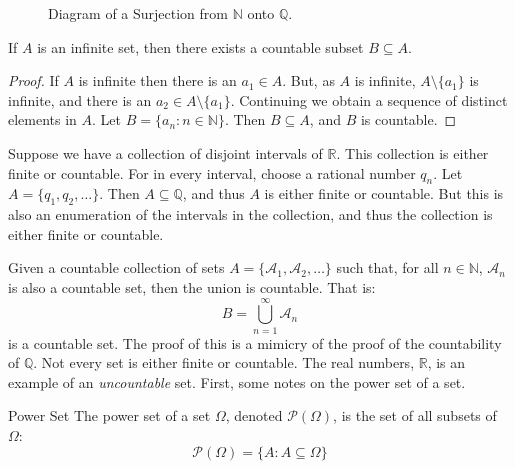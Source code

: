         \begin{figure}[H]
            \centering
            \captionsetup{type=figure}
            \resizebox{\textwidth}{!}{%
                
            }
            \caption{Diagram of a Surjection from
                     $\mathbb{N}$ onto $\mathbb{Q}$.}
            \label{fig:Bijection_N_and_Q}
        \end{figure}
        \begin{theorem}
            If $A$ is an infinite set, then there exists a
            countable subset $B\subseteq{A}$.
        \end{theorem}
        \begin{proof}
            If $A$ is infinite then there is an
            $a_{1}\in{A}$. But, as $A$ is infinite,
            $A\setminus\{a_{1}\}$ is infinite, and there
            is an $a_{2}\in{A}\setminus\{a_{1}\}$. Continuing
            we obtain a sequence of distinct elements in $A$.
            Let $B=\{a_{n}:n\in\mathbb{N}\}$. Then
            $B\subseteq{A}$, and $B$ is countable.
        \end{proof}
        \begin{lexample}
            Suppose we have a collection of disjoint intervals
            of $\mathbb{R}$. This collection is either finite
            or countable. For in every interval, choose a
            rational number $q_{n}$. Let
            $A=\{q_{1},q_{2},\hdots\}$. Then
            $A\subseteq\mathbb{Q}$, and thus $A$ is either
            finite or countable. But this is also an enumeration
            of the intervals in the collection, and thus the
            collection is either finite or countable.
        \end{lexample}
        Given a countable collection of sets
        $A=\{\mathcal{A}_{1},\mathcal{A}_{2},\hdots\}$ such
        that, for all $n\in\mathbb{N}$, $\mathcal{A}_{n}$ is
        also a countable set, then the union is countable. That is:
        \begin{equation}
            B=\bigcup_{n=1}^{\infty}\mathcal{A}_{n}
        \end{equation}
        is a countable set. The proof of this is a mimicry of
        the proof of the countability of $\mathbb{Q}$. Not
        every set is either finite or countable. The real numbers,
        $\mathbb{R}$, is an example of an \textit{uncountable}
        set. First, some notes on the power set of a set.
        \begin{ldefinition}{Power Set}
            The power set of a set $\Omega$, denoted
            $\mathcal{P}(\Omega)$, is the set of all subsets of
            $\Omega$:
            \begin{equation}
                \mathcal{P}(\Omega)=
                \{A:A\subseteq\Omega\}
            \end{equation}
        \end{ldefinition}
